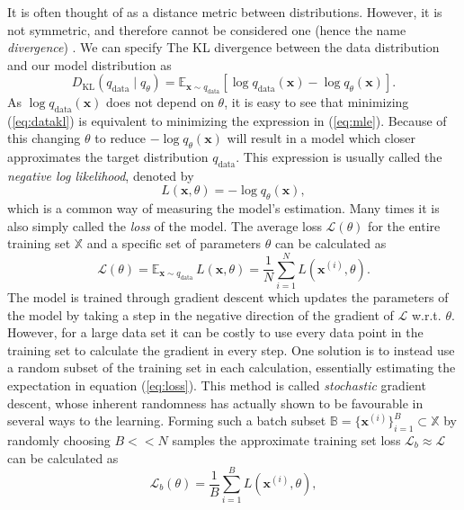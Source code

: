 \documentclass{report}
\begin{document}
It is often thought of as a distance metric between distributions. However, it is not symmetric, and therefore cannot be considered one (hence the name \textit{divergence}) \cite{goodfellow2016deep}. We can specify The KL divergence between the data distribution and our model distribution as 
\begin{equation} \label{eq:datakl}
    D_{\text{KL}}(q_{\text{data}} \mid q_{\theta} ) = \mathbb{E}_{\bm{x} \sim q_{\text{data}}} [\log q_{\text{data}}(\bm{x}) - \log q_{\theta}(\bm{x})].
\end{equation}
As $\log q_{\text{data}}(\bm{x})$ does not depend on $\theta$, it is easy to see that minimizing (\ref{eq:datakl}) is equivalent to minimizing the expression in (\ref{eq:mle}). Because of this changing $\theta$ to reduce $-\log q_{\theta}(\bm{x})$ will result in a model which closer approximates the target distribution $q_{\text{data}}$. This expression is usually called the \textit{negative log likelihood}, denoted by
\begin{equation} \label{eq:nll}
    L(\bm{x}, \theta) = -\log q_{\theta}(\bm{x}),
\end{equation}
which is a common way of measuring the model's estimation. Many times it is also simply called the \textit{loss} of the model. The average loss $\mathcal{L}(\theta)$ for the entire training set $\mathbb{X}$ and a specific set of parameters $\theta$ can be calculated as
\begin{equation} \label{eq:loss}
    \mathcal{L}(\theta) = \mathbb{E}_{\bm{x}\sim q_{\text{data}}} \, L(\bm{x}, \theta) = 
    \frac{1}{N} \sum_{i=1}^{N} L(\bm{x}^{(i)}, \theta).
\end{equation}
The model is trained through gradient descent which updates the parameters of the model by taking a step in the negative direction of the gradient of $\mathcal{L}$ w.r.t. $\theta$. However, for a large data set it can be costly to use every data point in the training set to calculate the gradient in every step. One solution is to instead use a random subset of the training set in each calculation, essentially estimating the expectation in equation (\ref{eq:loss}). This method is called \textit{stochastic} gradient descent, whose inherent randomness has actually shown to be favourable in several ways to the learning. Forming such a batch subset $\mathbb{B}=\{\bm{x}^{(i)}\}_{i=1}^{B} \subset \mathbb{X}$ by randomly choosing $B << N$ samples the approximate training set loss $\mathcal{L}_b \approx \mathcal{L}$ can be calculated as
\begin{equation}
    \mathcal{L}_{b}(\theta) = \frac{1}{B}\sum_{i=1}^B L(\bm{x}^{(i)}, \theta),
\end{equation}
\end{document}
